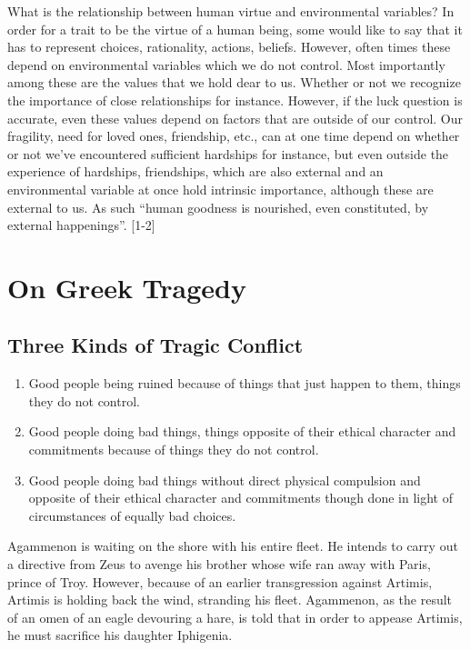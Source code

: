 \documentclass[
  letterpaper,
  DIV=11,
  numbers=noendperiod]{scrreprt}
\providecommand{\tightlist}{%
  \setlength{\itemsep}{0pt}\setlength{\parskip}{0pt}}\usepackage{longtable,booktabs,array}
\begin{document}
\begin{tcolorbox}[enhanced jigsaw, arc=.35mm, breakable, rightrule=.15mm, colback=white, colframe=quarto-callout-important-color-frame, bottomrule=.15mm, leftrule=.75mm, opacityback=0, toprule=.15mm, left=2mm]
\begin{tcolorbox}[enhanced jigsaw, arc=.35mm, breakable, rightrule=.15mm, colback=white, colframe=quarto-callout-tip-color-frame, bottomrule=.15mm, leftrule=.75mm, opacityback=0, toprule=.15mm, left=2mm]
What is the relationship between human virtue and environmental
variables? In order for a trait to be the virtue of a human being, some
would like to say that it has to represent choices, rationality,
actions, beliefs. However, often times these depend on environmental
variables which we do not control. Most importantly among these are the
values that we hold dear to us. Whether or not we recognize the
importance of close relationships for instance. However, if the luck
question is accurate, even these values depend on factors that are
outside of our control. Our fragility, need for loved ones, friendship,
etc., can at one time depend on whether or not we've encountered
sufficient hardships for instance, but even outside the experience of
hardships, friendships, which are also external and an environmental
variable at once hold intrinsic importance, although these are external
to us. As such ``human goodness is nourished, even constituted, by
external happenings''. {[}1-2{]}

\chapter{On Greek Tragedy}\label{on-greek-tragedy-1}

\section{Three Kinds of Tragic
Conflict}\label{three-kinds-of-tragic-conflict-1}

\begin{enumerate}
\def\labelenumi{\arabic{enumi}.}
\tightlist
\item
  Good people being ruined because of things that just happen to them,
  things they do not control.
\item
  Good people doing bad things, things opposite of their ethical
  character and commitments because of things they do not control.
\item
  Good people doing bad things without direct physical compulsion and
  opposite of their ethical character and commitments though done in
  light of circumstances of equally bad choices.
\end{enumerate}

Agammenon is waiting on the shore with his entire fleet. He intends to
carry out a directive from Zeus to avenge his brother whose wife ran
away with Paris, prince of Troy. However, because of an earlier
transgression against Artimis, Artimis is holding back the wind,
stranding his fleet. Agammenon, as the result of an omen of an eagle
devouring a hare, is told that in order to appease Artimis, he must
sacrifice his daughter Iphigenia.


\end{tcolorbox}
\end{tcolorbox}
\end{document}
